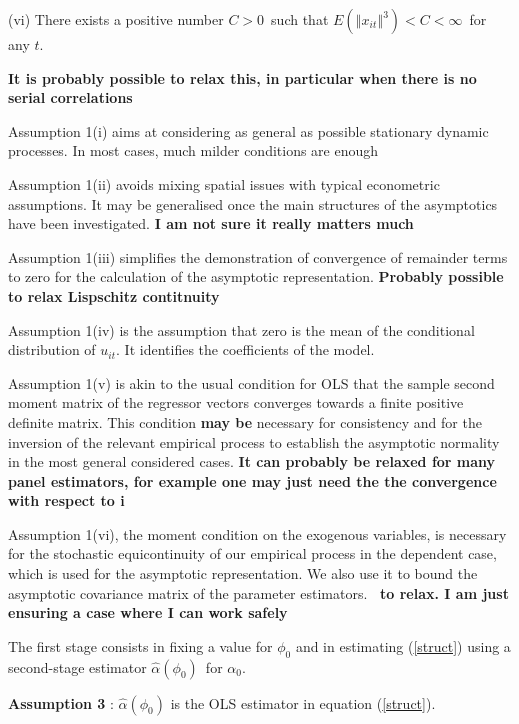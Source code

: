 \documentclass[a4paper,notitlepage,thmsb,11pt]{article}
\begin{document}
\noindent%
(vi) There exists a positive number $C>0$\ such that $E(\left\Vert
x_{it}\right\Vert ^{3})<C<\infty $\ for any $t$.

\textbf{It is probably possible to relax this, in particular when there is
no serial correlations}

\vskip0.5cm%

Assumption 1(i) aims at considering as general as possible stationary
dynamic processes. In most cases, much milder conditions are enough

Assumption 1(ii) avoids mixing spatial issues with typical econometric
assumptions. It may be generalised once the main structures of the
asymptotics have been investigated. \textbf{I am not sure it really matters
much}

Assumption 1(iii) simplifies the demonstration of convergence of remainder
terms to zero for the calculation of the asymptotic representation. \textbf{%
Probably possible to relax Lispschitz contitnuity}

Assumption 1(iv) is the assumption that zero is the mean of the conditional
distribution of $u_{it}$. It identifies the coefficients of the model. 

Assumption 1(v) is akin to the usual condition for OLS that the sample
second moment matrix of the regressor vectors converges towards a finite
positive definite matrix. This condition \textbf{may be }necessary for
consistency and for the inversion of the relevant empirical process to
establish the asymptotic normality in the most general considered cases. 
\textbf{It can probably be relaxed for many panel estimators, for example
one may just need the the convergence with respect to i}

Assumption 1(vi), the moment condition on the exogenous variables, is
necessary for the stochastic equicontinuity of our empirical process in the
dependent case, which is used for the asymptotic representation. We also use
it to bound the asymptotic covariance matrix of the parameter estimators.%
\textbf{\ to relax. I am just ensuring a case where I can work safely}

The first stage consists in fixing a value for $\phi _{0}$ and in estimating
(\ref{struct}) using a second-stage estimator $\hat{\alpha}(\phi _{0})$\ for 
$\alpha _{0}$.

\noindent%
\textbf{Assumption 3} : $\hat{\alpha}(\phi _{0})$ is the OLS estimator in
equation (\ref{struct}).
\end{document}
